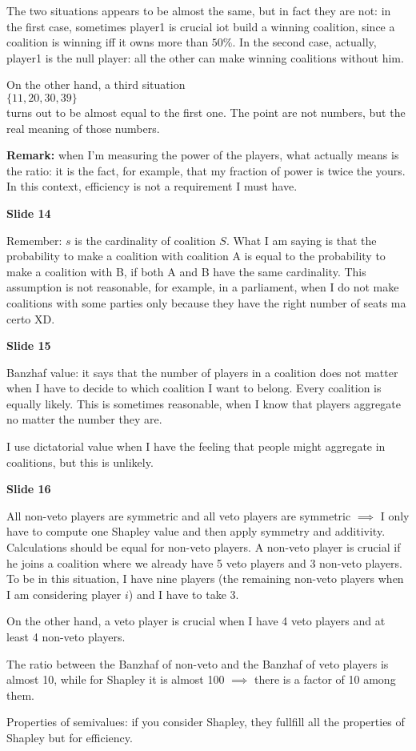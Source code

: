 \noindent The two situations appears to be almost the same, but in fact they are 
not: in the first case, sometimes player1 is crucial iot build a winning 
coalition, since a coalition is winning iff it owns more than $50\%$. 
In the second case, actually, player1 is the null player: all the other 
can make winning coalitions without him.

\noindent On the other hand, a third situation\\
$\{11, 20, 30, 39\}$\\
turns out to be almost equal to the first one. The point are not numbers, but 
the real meaning of those numbers.

\noindent \textbf{Remark:} when I'm measuring the power of the players, what 
actually means is the ratio: it is the fact, for example, that my fraction 
of power is twice the yours. In this context, efficiency is not a 
requirement I must have.

\bigskip
\noindent \textbf{Slide 14}

\noindent Remember: $s$ is the cardinality of coalition $S$. What I am saying 
is that the probability to make a coalition with coalition A is equal to 
the probability to make a coalition with B, if both A and B have the same 
cardinality. This assumption is not reasonable, for example, in a parliament, 
when I do not make coalitions with some parties only because they have the 
right number of seats {\huge ma certo XD}.

\bigskip
\noindent \textbf{Slide 15}

\noindent Banzhaf value: it says that the number of players in a coalition 
does not matter when I have to decide to which coalition I want to belong. 
Every coalition is equally likely. This is sometimes reasonable, when I 
know that players aggregate no matter the number they are.

\noindent I use dictatorial value when I have the feeling that people might 
aggregate in coalitions, but this is unlikely.

\bigskip
\noindent \textbf{Slide 16}

\noindent All non-veto players are symmetric and all veto players are 
symmetric $\implies$ I only have to compute one Shapley value and then 
apply symmetry and additivity. Calculations should be equal for non-veto 
players. A non-veto player is crucial if he joins a coalition where we already 
have 5 veto players and 3 non-veto players. To be in this situation, I have 
nine players (the remaining non-veto players when I am considering player 
$i$) and I have to take 3.

\noindent On the other hand, a veto player is crucial when I have 4 veto 
players and at least 4 non-veto players.

\noindent The ratio between the Banzhaf of non-veto and the Banzhaf of 
veto players is almost 10, while for Shapley it is almost 100 $\implies$ 
there is a factor of 10 among them.

\noindent Properties of semivalues: if you consider Shapley, they fullfill 
all the properties of Shapley but for efficiency.

%
